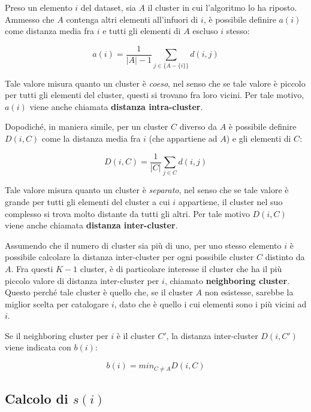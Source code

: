 \documentclass[italian]{article}
\begin{document}
			Preso un elemento $i$ del dataset, sia $A$ il cluster in cui l'algoritmo
			lo ha riposto. Ammesso che $A$ contenga altri elementi all'infuori di $i$,
			è possibile definire $a(i)$ come distanza media fra $i$ e tutti gli elementi
			di $A$ escluso $i$ stesso:

			\begin{equation}
				a(i) = \frac{1}{|A| - 1} \sum_{j \in \{A - \{i\}\}} d(i, j)
			\end{equation}

			Tale valore misura quanto un cluster è \textit{coeso}, nel senso
			che se tale valore è piccolo per tutti gli elementi del cluster,
			questi si trovano fra loro vicini. Per tale motivo, $a(i)$ viene
			anche chiamata \textbf{distanza intra-cluster}.

			Dopodiché, in maniera simile, per un cluster $C$ diverso da $A$
			è possibile definire $D(i, C)$ come la distanza media fra $i$
			(che appartiene ad $A$) e gli elementi di $C$:

			\begin{equation*}
				D(i, C) = \frac{1}{|C|} \sum_{j \in C} d(i, j)
			\end{equation*}

			Tale valore misura quanto un cluster è \textit{separato}, nel senso
			che se tale valore è grande per tutti gli elementi del cluster a cui
			$i$ appartiene, il cluster nel suo complesso si trova molto distante
			da tutti gli altri. Per tale motivo $D(i, C)$ viene anche chiamata
			\textbf{distanza inter-cluster}.

			Assumendo che il numero di cluster sia più di uno, per uno stesso elemento
			$i$ è possibile calcolare la distanza inter-cluster per ogni possibile
			cluster $C$ distinto da $A$. Fra questi $K - 1$ cluster, è di particolare
			interesse il cluster che ha il più piccolo valore di distanza inter-cluster
			per $i$, chiamato \textbf{neighboring cluster}. Questo perché tale cluster
			è quello che, se il cluster $A$ non esistesse, sarebbe la miglior scelta
			per catalogare $i$, dato che è quello i cui elementi sono i più vicini ad
			$i$.

			Se il neighboring cluster per $i$ è il cluster $C'$, la distanza
			inter-cluster $D(i, C')$ viene indicata con $b(i)$:

			\begin{equation}
				b(i) = min_{C \neq A} D(i, C)
			\end{equation}

		\subsection{Calcolo di $s(i)$}
\end{document}
